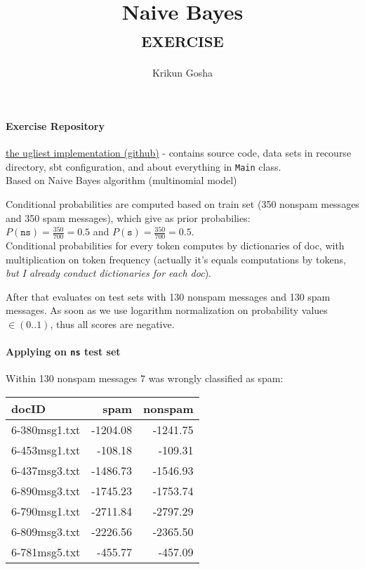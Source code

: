 \documentclass{article}
\title{Naive Bayes \\ \textsc{exercise}}
\author{Krikun Gosha}
\begin{document}
\maketitle
\begin{multicols}{2}

  \paragraph*{Exercise Repository}

\href{https://github.com/kriku/ir-nb}{the ugliest implementation (github)}
- contains source code, data sets in recourse directory, sbt configuration, and
about everything in \texttt{Main} class.\\

Based on Naive Bayes algorithm (multinomial model)
\cite[Chapter 13, figure 13.2]{irbook}

Conditional probabilities are computed based on train set (350 nonspam messages
and 350 spam messages), which give as prior probabilies:\\

$ P(\texttt{ns}) = \frac{350}{700} = 0.5 $
and 
$ P(\texttt{s}) = \frac{350}{700} = 0.5 $.\\

Conditional probabilities for every token computes by dictionaries of doc, with
multiplication on token frequency (actually it's equals computations by tokens,
\textit{but I already conduct dictionaries for each doc}).

After that evaluates on test sets with 130 nonspam messages and 130 spam
messages. As soon as we use logarithm normalization on probability values $\in (0..1)$,
thus all scores are negative.




\paragraph*{Applying on \texttt{ns} test set}

Within 130 nonspam messages 7 was wrongly classified as spam:\\

\begin{center}
\begin{tabular}{lrr}
  docID & spam & nonspam \\
  \hline
  6-380msg1.txt & -1204.08 & -1241.75 \\
  6-453msg1.txt & -108.18 & -109.31 \\
  6-437msg3.txt & -1486.73 & -1546.93 \\
  6-890msg3.txt & -1745.23 & -1753.74 \\
  6-790msg1.txt & -2711.84 & -2797.29 \\
  6-809msg3.txt & -2226.56 & -2365.50 \\
  6-781msg5.txt & -455.77 & -457.09 \\
  \hline
\end{tabular}


\end{center}
\end{multicols}
\end{document}
